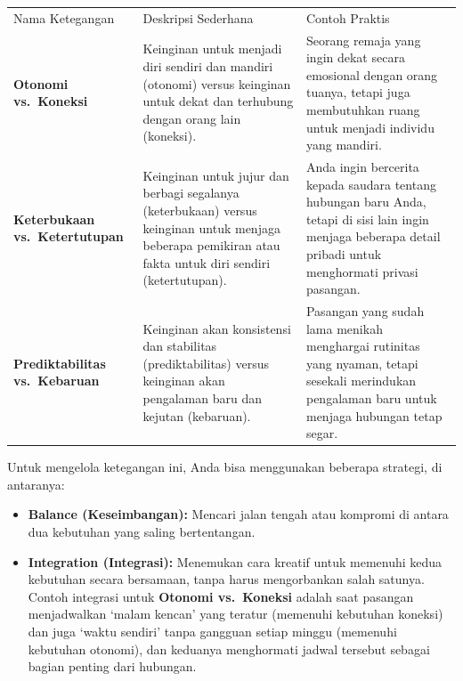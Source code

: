 \documentclass[
  letterpaper,
  DIV=11,
  numbers=noendperiod]{scrreprt}
\providecommand{\tightlist}{%
  \setlength{\itemsep}{0pt}\setlength{\parskip}{0pt}}
\begin{document}
\begin{longtable}[]{@{}
  >{\raggedright\arraybackslash}p{}
  >{\raggedright\arraybackslash}p{}
  >{\raggedright\arraybackslash}p{}@{}}
\toprule\noalign{}
\endhead
\bottomrule\noalign{}
\endlastfoot
Nama Ketegangan & Deskripsi Sederhana & Contoh Praktis \\
\textbf{Otonomi vs.~Koneksi} & Keinginan untuk menjadi diri sendiri dan
mandiri (otonomi) versus keinginan untuk dekat dan terhubung dengan
orang lain (koneksi). & Seorang remaja yang ingin dekat secara emosional
dengan orang tuanya, tetapi juga membutuhkan ruang untuk menjadi
individu yang mandiri. \\
\textbf{Keterbukaan vs.~Ketertutupan} & Keinginan untuk jujur dan
berbagi segalanya (keterbukaan) versus keinginan untuk menjaga beberapa
pemikiran atau fakta untuk diri sendiri (ketertutupan). & Anda ingin
bercerita kepada saudara tentang hubungan baru Anda, tetapi di sisi lain
ingin menjaga beberapa detail pribadi untuk menghormati privasi
pasangan. \\
\textbf{Prediktabilitas vs.~Kebaruan} & Keinginan akan konsistensi dan
stabilitas (prediktabilitas) versus keinginan akan pengalaman baru dan
kejutan (kebaruan). & Pasangan yang sudah lama menikah menghargai
rutinitas yang nyaman, tetapi sesekali merindukan pengalaman baru untuk
menjaga hubungan tetap segar. \\
\end{longtable}

Untuk mengelola ketegangan ini, Anda bisa menggunakan beberapa strategi,
di antaranya:

\begin{itemize}
\tightlist
\item
  \textbf{Balance (Keseimbangan):} Mencari jalan tengah atau kompromi di
  antara dua kebutuhan yang saling bertentangan.
\item
  \textbf{Integration (Integrasi):} Menemukan cara kreatif untuk
  memenuhi kedua kebutuhan secara bersamaan, tanpa harus mengorbankan
  salah satunya. Contoh integrasi untuk \textbf{Otonomi vs.~Koneksi}
  adalah saat pasangan menjadwalkan `malam kencan' yang teratur
  (memenuhi kebutuhan koneksi) dan juga `waktu sendiri' tanpa gangguan
  setiap minggu (memenuhi kebutuhan otonomi), dan keduanya menghormati
  jadwal tersebut sebagai bagian penting dari hubungan.
\end{itemize}
\end{document}
